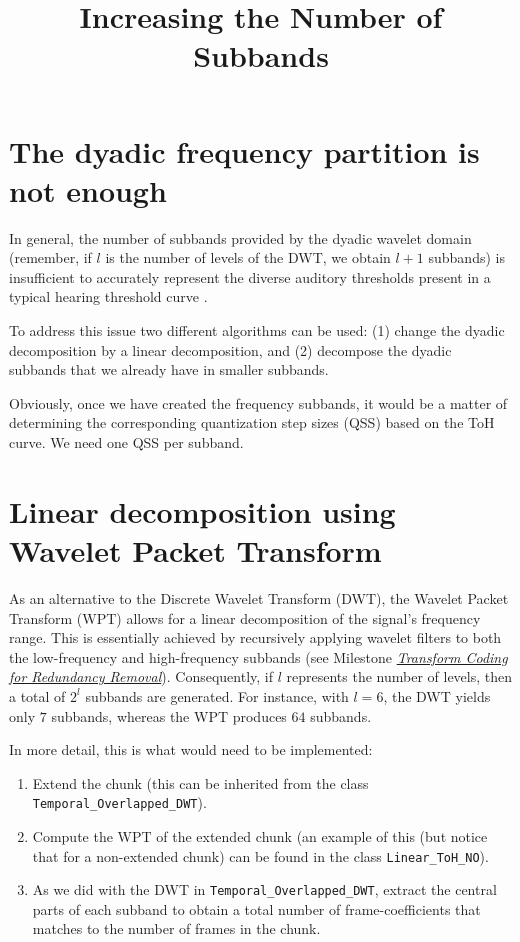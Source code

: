
\title{Increasing the Number of Subbands}

\maketitle
\tableofcontents

\section{The dyadic frequency partition is not enough}

In general, the number of subbands provided by the dyadic wavelet
domain~\cite{sayood2017introduction,vetterli1995wavelets} (remember,
if $l$ is the number of levels of the DWT, we obtain $l+1$ subbands)
is insufficient to accurately represent the diverse auditory
thresholds present in a typical hearing threshold curve
\cite{bosi2003intro}.

To address this issue two different algorithms can be used: (1) change
the dyadic decomposition by a linear decomposition, and (2) decompose
the dyadic subbands that we already have in smaller subbands.

Obviously, once we have created the frequency subbands, it would be a
matter of determining the corresponding quantization step sizes (QSS)
based on the ToH curve. We need one QSS per subband.

\section{Linear decomposition using Wavelet Packet Transform}
\label{sec:linear}
As an alternative to the Discrete Wavelet Transform (DWT), the Wavelet
Packet Transform (WPT) allows for a linear decomposition of the
signal's frequency range. This is essentially achieved by recursively
applying wavelet filters to both the low-frequency and high-frequency
subbands (see Milestone
\href{https://tecnologias-multimedia.github.io/contents/transform_coding/}{\emph{Transform
    Coding for Redundancy Removal}}). Consequently, if $l$ represents
the number of levels, then a total of $2^l$ subbands are
generated. For instance, with $l=6$, the DWT yields only $7$ subbands,
whereas the WPT produces $64$ subbands.

In more detail, this is what would need to be implemented:
\begin{enumerate}
\item Extend the chunk (this can be inherited from the class
  \verb|Temporal_Overlapped_DWT|).
\item Compute the WPT of the extended chunk (an example of this (but
  notice that for a non-extended chunk) can be found in the class
  \verb|Linear_ToH_NO|).
\item As we did with the DWT in \verb|Temporal_Overlapped_DWT|,
  extract the central parts of each subband to obtain a total number
  of frame-coefficients that matches to the number of frames in the
  chunk.
\end{enumerate}

